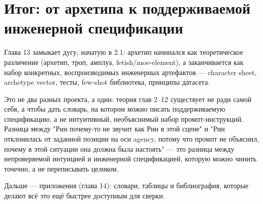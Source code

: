 \section{Итог: от архетипа к поддерживаемой инженерной спецификации}

Глава 13 замыкает дугу, начатую в 2.1: архетип начинался как теоретическое различение (архетип, троп, амплуа, fetish/moe-element), а заканчивается как набор конкретных, воспроизводимых инженерных артефактов — character sheet, archetype vector, тесты, few-shot библиотека, принципы датасета.

Это не два разных проекта, а один: теория глав 2--12 существует не ради самой себя, а чтобы дать словарь, на котором можно писать поддерживаемую спецификацию, а не интуитивный, необъяснимый набор промпт-инструкций. Разница между "Рин почему-то не звучит как Рин в этой сцене" и "Рин отклонилась от заданной позиции на оси agency, потому что промпт не объяснил, почему в этой ситуации она должна была настоять" — это разница между непроверяемой интуицией и инженерной спецификацией, которую можно чинить точечно, а не переписывать целиком.

Дальше — приложения (глава 14): словари, таблицы и библиография, которые делают всё это ещё быстрее доступным для сверки.
